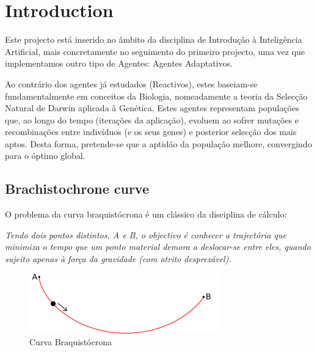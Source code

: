 \documentclass[a4paper]{article}
\title{\documentTitle}
\author{\documentAuthors{}}
\begin{document}
\renewcommand{\figurename}{Figure}
\maketitle
\cleardoublepage

\tableofcontents
\cleardoublepage

\setlength{\parindent}{1cm}
\setlength{\parskip}{0.3cm}

\section{Introduction}
\indent \indent Este projecto está inserido no âmbito da disciplina de Introdução à Inteligência Artificial,
mais concretamente no seguimento do primeiro projecto, uma vez que implementamos outro tipo de Agentes: Agentes Adaptativos.

Ao contrário dos agentes já estudados (Reactivos), estes baseiam-se fundamentalmente em conceitos da Biologia, nomeadamente a teoria da Selecção Natural de Darwin aplicada à Genética.
Estes agentes representam populações que, ao longo do tempo (iterações da aplicação), evoluem ao sofrer mutações e recombinações entre indivíduos (e os seus genes) e posterior selecção dos mais aptos.
Desta forma, pretende-se que a aptidão da população melhore, convergindo para o óptimo global.

\subsection{Brachistochrone curve}

\indent \indent O problema da curva braquistócrona é um clássico da disciplina de cálculo:

\emph{Tendo dois pontos distintos, A e B, o objectivo é conhecer a trajectória que minimiza o tempo que um ponto material demora a deslocar-se entre eles, quando sujeito apenas à força da gravidade (com atrito desprezável).}

\begin{figure}[ht]
	\centering
	\includegraphics[scale=0.5]{images/Brachistochrone.png}
	\caption{Curva Braquistócrona}
	\label{fig:brachistochrone}
\end{figure}
\end{document}
